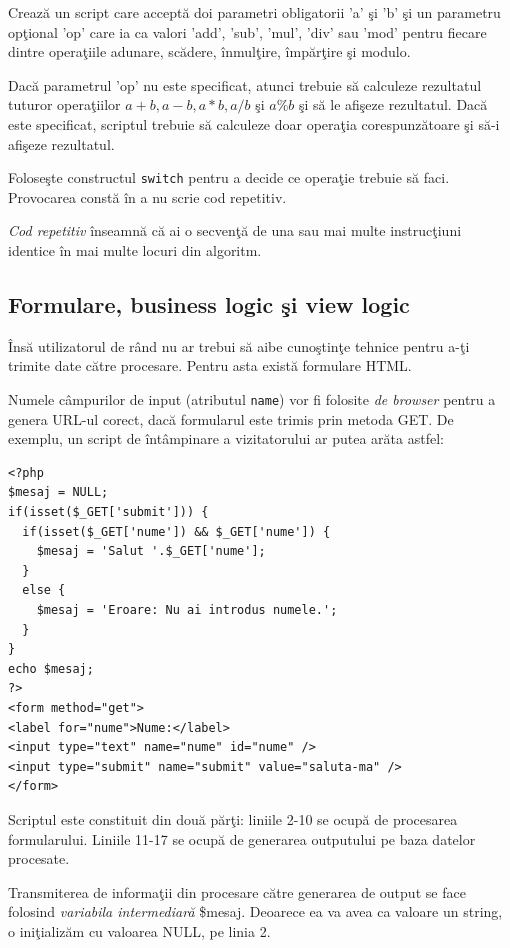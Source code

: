 \begin{Exercise}[title={Un calculator complet},difficulty=2]
Crează un script care acceptă doi parametri obligatorii 'a' şi 'b' şi un parametru
opţional 'op' care ia ca valori 'add', 'sub', 'mul', 'div' sau 'mod' pentru fiecare
dintre operaţiile adunare, scădere, înmulţire, împărţire şi modulo.

Dacă parametrul 'op' nu este specificat, atunci trebuie să calculeze rezultatul
tuturor operaţiilor $a+b,a-b,a*b,a/b$ şi $a\%b$ şi să le afişeze rezultatul. Dacă este
specificat, scriptul trebuie să calculeze doar operaţia corespunzătoare şi
să-i afişeze rezultatul.

Foloseşte constructul \texttt{switch} pentru a decide ce operaţie trebuie să faci.
Provocarea constă în a nu scrie cod repetitiv.

\textit{Cod repetitiv} înseamnă că ai o secvenţă de una sau mai multe instrucţiuni identice
în mai multe locuri din algoritm.
\end{Exercise}

\subsection{Formulare, business logic şi view logic}

Însă utilizatorul de rând nu ar trebui să aibe cunoştinţe tehnice pentru a-ţi
trimite date către procesare. Pentru asta există formulare HTML.

Numele câmpurilor de input (atributul \texttt{name}) vor fi folosite \textit{de browser}
pentru a genera URL-ul corect, dacă formularul este
trimis prin metoda GET. De exemplu, un script de întâmpinare a
vizitatorului ar putea arăta astfel:
\begin{lstlisting}
<?php
$mesaj = NULL;
if(isset($_GET['submit'])) {
  if(isset($_GET['nume']) && $_GET['nume']) {
	$mesaj = 'Salut '.$_GET['nume'];
  }
  else {
	$mesaj = 'Eroare: Nu ai introdus numele.';
  }
}
echo $mesaj;
?>
<form method="get">
<label for="nume">Nume:</label>
<input type="text" name="nume" id="nume" />
<input type="submit" name="submit" value="saluta-ma" />
</form>
\end{lstlisting}
Scriptul este constituit din două părţi: liniile 2-10 se ocupă de procesarea
formularului. Liniile 11-17 se ocupă de generarea outputului pe baza datelor
procesate.

Transmiterea de informaţii din procesare către generarea de output se face
folosind \textsl{variabila intermediară} \$mesaj. Deoarece ea va avea ca valoare un
string, o iniţializăm cu valoarea NULL, pe linia 2.

